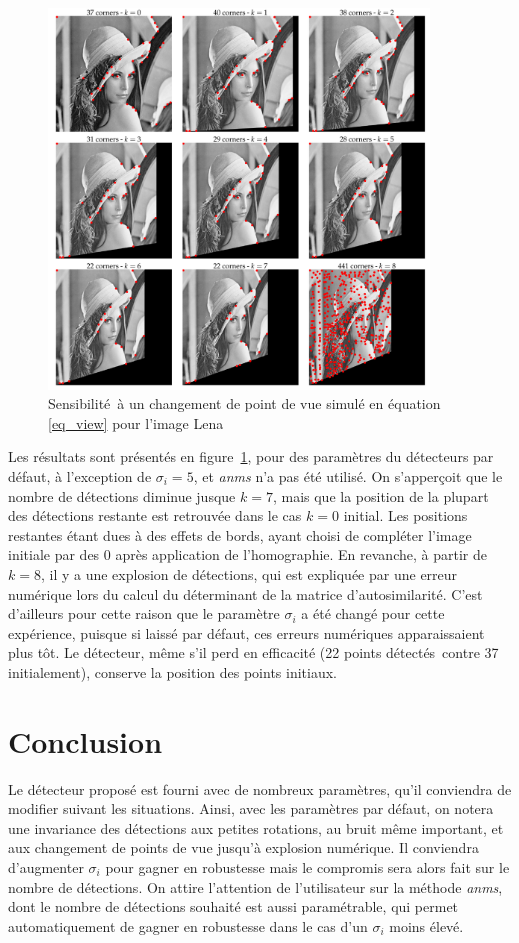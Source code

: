 \documentclass[12pt,a4paper,onecolumn]{article}
\begin{document}
\begin{figure}[H]
	\centering
	\includegraphics[width = 0.9\textwidth]{4_view}
	\caption{Sensibilité à un changement de point de vue simulé en équation \eqref{eq_view} pour l'image Lena}
	\label{fig_view}
\end{figure}

Les résultats sont présentés en figure~\ref{fig_view}, pour des paramètres du détecteurs par défaut, à l'exception de \(\sigma_i = 5 \), et \textit{anms} n'a pas été utilisé. On s'apperçoit que le nombre de détections diminue jusque \(k = 7\), mais que la position de la plupart des détections restante est retrouvée dans le cas \( k = 0\) initial. Les positions restantes étant dues à des effets de bords, ayant choisi de compléter l'image initiale par des 0 après application de l'homographie. En revanche, à partir de \(k = 8\), il y a une explosion de détections, qui est expliquée par une erreur numérique lors du calcul du déterminant de la matrice d'autosimilarité. C'est d'ailleurs pour cette raison que le paramètre \(\sigma_i\) a été changé pour cette expérience, puisque si laissé par défaut, ces erreurs numériques apparaissaient plus tôt. Le détecteur, même s'il perd en efficacité (22 points détectés contre 37 initialement), conserve la position des points initiaux.

\section{Conclusion}

Le détecteur proposé est fourni avec de nombreux paramètres, qu'il conviendra de modifier suivant les situations. Ainsi, avec les paramètres par défaut, on notera une invariance des détections aux petites rotations, au bruit même important, et aux changement de points de vue jusqu'à explosion numérique. Il conviendra d'augmenter \(\sigma_i \) pour gagner en robustesse mais le compromis sera alors fait sur le nombre de détections. On attire l'attention de l'utilisateur sur la méthode \textit{anms}, dont le nombre de détections souhaité est aussi paramétrable, qui permet automatiquement de gagner en robustesse dans le cas d'un \(\sigma_i \) moins élevé.
\end{document}
